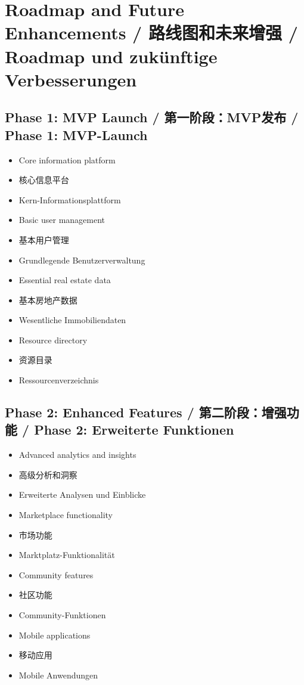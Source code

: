 \section{Roadmap and Future Enhancements / 路线图和未来增强 / Roadmap und zukünftige Verbesserungen}

\subsection{Phase 1: MVP Launch / 第一阶段：MVP发布 / Phase 1: MVP-Launch}
\begin{itemize}
    \item Core information platform
    \item 核心信息平台
    \item Kern-Informationsplattform
    \item Basic user management
    \item 基本用户管理
    \item Grundlegende Benutzerverwaltung
    \item Essential real estate data
    \item 基本房地产数据
    \item Wesentliche Immobiliendaten
    \item Resource directory
    \item 资源目录
    \item Ressourcenverzeichnis
\end{itemize}

\subsection{Phase 2: Enhanced Features / 第二阶段：增强功能 / Phase 2: Erweiterte Funktionen}
\begin{itemize}
    \item Advanced analytics and insights
    \item 高级分析和洞察
    \item Erweiterte Analysen und Einblicke
    \item Marketplace functionality
    \item 市场功能
    \item Marktplatz-Funktionalität
    \item Community features
    \item 社区功能
    \item Community-Funktionen
    \item Mobile applications
    \item 移动应用
    \item Mobile Anwendungen
\end{itemize}

